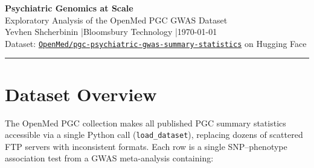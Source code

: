 \documentclass[11pt, a4paper]{article}
\begin{document}
\begin{center}
  {\LARGE\bfseries\color{accent} Psychiatric Genomics at Scale}\\[4pt]
  {\large Exploratory Analysis of the OpenMed PGC GWAS Dataset}\\[10pt]
  {\normalsize Yevhen Shcherbinin \quad|\quad Bloomsbury Technology \quad|\quad \today}\\[2pt]
  {\small\color{muted}
    Dataset: \href{https://huggingface.co/collections/OpenMed/pgc-psychiatric-gwas-summary-statistics}%
    {\texttt{OpenMed/pgc-psychiatric-gwas-summary-statistics}} on Hugging Face}
\end{center}

\vspace{4pt}\hrule\vspace{14pt}

\begin{abstract}
\noindent
OpenMed has released a standardised collection of all genome-wide association study
(GWAS) meta-analyses published by the Psychiatric Genomics Consortium (PGC),
comprising \textbf{1.14 billion rows} across \textbf{12 psychiatric conditions} and
\textbf{52 landmark studies}. This report presents an exploratory analysis of the
dataset: schema profiling, minor allele frequency distributions, effect-size
characterisation, and cross-disorder genetic effect correlations across 489,904
shared SNPs. We find the strongest raw-effect correlation between autism spectrum
disorder and the cross-disorder meta-analysis ($r = 0.386$), a meaningful ADHD signal
($r = 0.216$), and a novel schizophrenia--substance-use link ($r = 0.190$).
A Manhattan plot and QQ plot for the schizophrenia mega-GWAS (scz2022, $N \approx 97{,}000$)
confirm genomic inflation consistent with true polygenicity ($\lambda_\text{GC} > 1$).
\end{abstract}

\vspace{8pt}

\section{Dataset Overview}

The OpenMed PGC collection makes all published PGC summary statistics accessible
via a single Python call (\texttt{load\_dataset}), replacing dozens of scattered FTP
servers with inconsistent formats. Each row is a single SNP--phenotype association
test from a GWAS meta-analysis containing:
\end{document}
